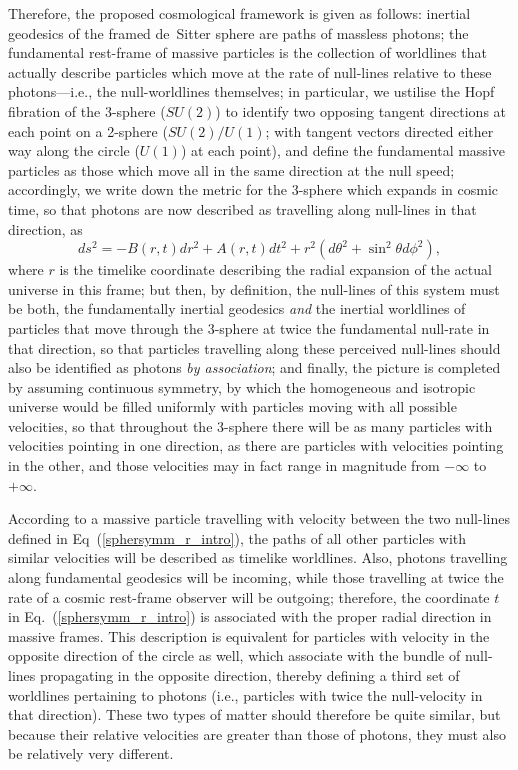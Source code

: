 Therefore, the proposed cosmological framework is given as follows: inertial geodesics of the framed de~Sitter sphere are paths of massless photons; the fundamental rest-frame of massive particles is the collection of worldlines that actually describe particles which move at the rate of null-lines relative to these photons---i.e., the null-worldlines themselves; in particular, we ustilise the Hopf fibration of the 3-sphere ($SU(2)$) to identify two opposing tangent directions at each point on a 2-sphere ($SU(2)/U(1)$; with tangent vectors directed either way along the circle ($U(1)$) at each point), and define the fundamental massive particles as those which move all in the same direction at the null speed; accordingly, we write down the metric for the 3-sphere which expands in cosmic time, so that photons are now described as travelling along null-lines in that direction, as
\begin{equation}
ds^2=-B(r,t)dr^2+A(r,t)dt^2+r^2\left(d\theta^2+\sin^2\theta{d\phi^2}\right),\label{sphersymm_r_intro}
\end{equation}
where $r$ is the timelike coordinate describing the radial expansion of the actual universe in this frame; but then, by definition, the null-lines of this system must be both, the fundamentally inertial geodesics \textit{and} the inertial worldlines of particles that move through the 3-sphere at twice the fundamental null-rate in that direction, so that particles travelling along these perceived null-lines should also be identified as photons \textit{by association}; and finally, the picture is completed by assuming continuous symmetry, by which the homogeneous and isotropic universe would be filled uniformly with particles moving with all possible velocities, so that throughout the 3-sphere there will be as many particles with velocities pointing in one direction, as there are particles with velocities pointing in the other, and those velocities may in fact range in magnitude from $-\infty$ to $+\infty$.

According to a massive particle travelling with velocity between the two null-lines defined in Eq~(\ref{sphersymm_r_intro}), the paths of all other particles with similar velocities will be described as timelike worldlines. Also, photons travelling along fundamental geodesics will be incoming, while those travelling at twice the rate of a cosmic rest-frame observer will be outgoing; therefore, the coordinate $t$ in Eq.~(\ref{sphersymm_r_intro}) is associated with the proper radial direction in massive frames. This description is equivalent for particles with velocity in the opposite direction of the circle as well, which associate with the bundle of null-lines propagating in the opposite direction, thereby defining a third set of worldlines pertaining to photons (i.e., particles with twice the null-velocity in that direction). These two types of matter should therefore be quite similar, but because their relative velocities are greater than those of photons, they must also be relatively very different.

